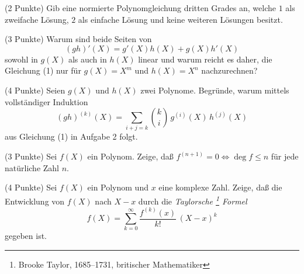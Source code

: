 \documentclass{algsheet}
\author{Dipl.-Math.~Franz Vogler}
\date{16.~November 2010}
\begin{document}
                \maketitle



\begin{exercise}(2 Punkte)\newline
    Gib eine normierte Polynomgleichung dritten Grades an, welche \(1\)
    als zweifache Lösung, \(2\) als einfache Lösung und keine weiteren Lösungen
    besitzt.
\end{exercise}

\begin{exercise}(3 Punkte)\newline
    Warum sind beide Seiten von 
\begin{equation}
 (gh)'(X)=g'(X)h(X)+g(X)h'(X)
\end{equation}
 sowohl in
    \(g(X)\) als auch in \(h(X)\) linear und warum reicht es daher, die
    Gleichung (1) nur für \(g(X) = X^m\) und \(h(X) = X^n\)
    nachzurechnen?
\end{exercise}





\begin{exercise}(4 Punkte)\newline
    Seien \(g(X)\) und \(h(X)\) zwei Polynome. Begründe, warum
    mittels vollständiger Induktion
    \[
        (g h)^{(k)}(X)
        = \sum_{i + j = k} \binom k i \, g^{(i)}(X) \, h^{(j)}(X)
    \]
    aus Gleichung (1) in Aufgabe 2 folgt.
\end{exercise}

\begin{exercise}(3 Punkte)\newline
    Sei \(f(X)\) ein Polynom. Zeige, daß \(f^{(n + 1)} = 0 \iff \deg f \leq n\)
    für jede natürliche Zahl \(n\).
\end{exercise}
\newpage

\begin{exercise}(4 Punkte)\newline
    Sei \(f(X)\) ein Polynom und \(x\) eine komplexe Zahl. Zeige, daß die
    Entwicklung von \(f(X)\) nach \(X - x\) durch die \emph{Taylorsche%
    \footnote{Brooke Taylor, 1685--1731, britischer Mathematiker} Formel}
    \[
        f(X) = \sum_{k = 0}^\infty \frac{f^{(k)}(x)}{k!} \, (X - x)^k
    \]
    gegeben ist.
\end{exercise}
\end{document}
